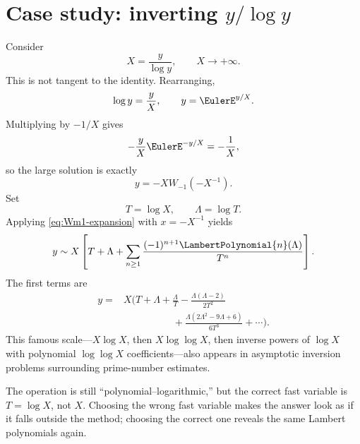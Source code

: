 \documentclass[11pt,openany]{book}
\theoremstyle{definition}
\theoremstyle{plain}
\theoremstyle{remark}
\begin{document}
\section{Case study: inverting \texorpdfstring{\(y/\log y\)}{y/log y}}
Consider
\begin{equation}\label{eq:y-over-log-y}
 X=\frac{y}{\log y},
 \qquad X\to+\infty.
\end{equation}
This is not tangent to the identity.  Rearranging,
\[
 \log y=\frac yX,
 \qquad
 y=\EulerE^{y/X}.
\]
Multiplying by \(-1/X\) gives
\[
 -\frac yX\EulerE^{-y/X}=-\frac1X,
\]
so the large solution is exactly
\begin{equation}\label{eq:y-over-log-exact}
 y=-XW_{-1}(-X^{-1}).
\end{equation}
Set
\[
 T=\log X,
 \qquad \Lambda=\log T.
\]
Applying \cref{eq:Wm1-expansion} with \(x=-X^{-1}\) yields
\begin{equation}\label{eq:y-over-log-expansion}
 y\sim X\left[
 T+\Lambda+\sum_{n\ge1}\frac{(-1)^{n+1}\LambertPolynomial{n}(\Lambda)}{T^n}
 \right].
\end{equation}
The first terms are
\begin{equation}\label{eq:y-over-log-first}
\begin{split}
 y={}&X\Biggl(
 T+\Lambda+\frac{\Lambda}{T}
 -\frac{\Lambda(\Lambda-2)}{2T^2}\\
 &\hspace{5em}+
 \frac{\Lambda(2\Lambda^2-9\Lambda+6)}{6T^3}
 +\cdots\Biggr).
\end{split}
\end{equation}
This famous scale---\(X\log X\), then \(X\log\log X\), then inverse powers of
\(\log X\) with polynomial \(\log\log X\) coefficients---also appears in
asymptotic inversion problems surrounding prime-number estimates.

\begin{intuitionbox}
The operation is still ``polynomial--logarithmic,'' but the correct fast
variable is \(T=\log X\), not \(X\).  Choosing the wrong fast variable makes
the answer look as if it falls outside the method; choosing the correct one
reveals the same Lambert polynomials again.
\end{intuitionbox}
\end{document}
